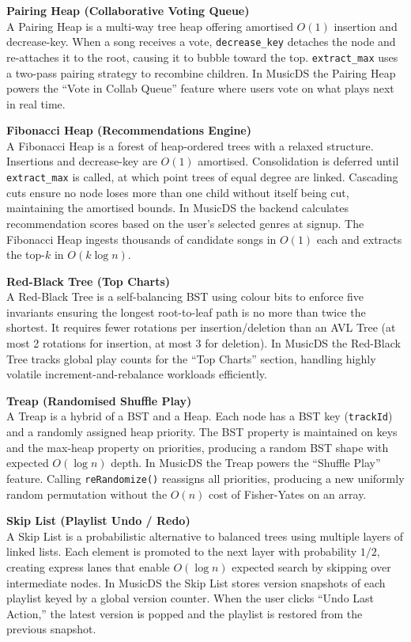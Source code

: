 \documentclass[12pt, a4paper]{article}
\begin{document}
\textbf{Pairing Heap (Collaborative Voting Queue)}\\
A Pairing Heap is a multi-way tree heap offering amortised $O(1)$ insertion and decrease-key. When a song receives a vote, \texttt{decrease\_key} detaches the node and re-attaches it to the root, causing it to bubble toward the top. \texttt{extract\_max} uses a two-pass pairing strategy to recombine children. In MusicDS the Pairing Heap powers the ``Vote in Collab Queue'' feature where users vote on what plays next in real time.

\textbf{Fibonacci Heap (Recommendations Engine)}\\
A Fibonacci Heap is a forest of heap-ordered trees with a relaxed structure. Insertions and decrease-key are $O(1)$ amortised. Consolidation is deferred until \texttt{extract\_max} is called, at which point trees of equal degree are linked. Cascading cuts ensure no node loses more than one child without itself being cut, maintaining the amortised bounds. In MusicDS the backend calculates recommendation scores based on the user's selected genres at signup. The Fibonacci Heap ingests thousands of candidate songs in $O(1)$ each and extracts the top-$k$ in $O(k \log n)$.

\textbf{Red-Black Tree (Top Charts)}\\
A Red-Black Tree is a self-balancing BST using colour bits to enforce five invariants ensuring the longest root-to-leaf path is no more than twice the shortest. It requires fewer rotations per insertion/deletion than an AVL Tree (at most 2 rotations for insertion, at most 3 for deletion). In MusicDS the Red-Black Tree tracks global play counts for the ``Top Charts'' section, handling highly volatile increment-and-rebalance workloads efficiently.

\textbf{Treap (Randomised Shuffle Play)}\\
A Treap is a hybrid of a BST and a Heap. Each node has a BST key (\texttt{trackId}) and a randomly assigned heap priority. The BST property is maintained on keys and the max-heap property on priorities, producing a random BST shape with expected $O(\log n)$ depth. In MusicDS the Treap powers the ``Shuffle Play'' feature. Calling \texttt{reRandomize()} reassigns all priorities, producing a new uniformly random permutation without the $O(n)$ cost of Fisher-Yates on an array.

\textbf{Skip List (Playlist Undo / Redo)}\\
A Skip List is a probabilistic alternative to balanced trees using multiple layers of linked lists. Each element is promoted to the next layer with probability $1/2$, creating express lanes that enable $O(\log n)$ expected search by skipping over intermediate nodes. In MusicDS the Skip List stores version snapshots of each playlist keyed by a global version counter. When the user clicks ``Undo Last Action,'' the latest version is popped and the playlist is restored from the previous snapshot.
\end{document}
